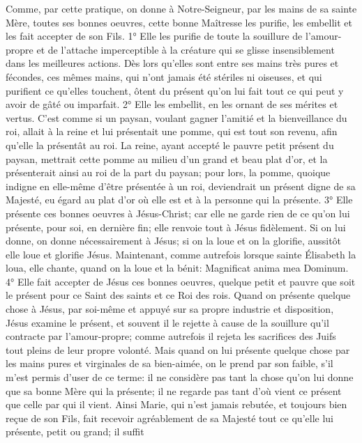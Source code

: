  Comme, par cette pratique, on donne à Notre-Seigneur, par les mains de sa sainte Mère, toutes ses bonnes
oeuvres, cette bonne Maîtresse les purifie, les embellit et les fait accepter de son Fils.
1° Elle les purifie de toute la souillure de l'amour-propre et de l'attache imperceptible à la créature qui se glisse
insensiblement dans les meilleures actions. Dès lors qu'elles sont entre ses mains très pures et fécondes, ces
mêmes mains, qui n'ont jamais été stériles ni oiseuses, et qui purifient ce qu'elles touchent, ôtent du présent qu'on
lui fait tout ce qui peut y avoir de gâté ou imparfait.
 2° Elle les embellit, en les ornant de ses mérites et vertus. C'est comme si un paysan, voulant gagner l'amitié
et la bienveillance du roi, allait à la reine et lui présentait une pomme, qui est tout son revenu, afin qu'elle la
présentât au roi. La reine, ayant accepté le pauvre petit présent du paysan, mettrait cette pomme au milieu d'un
grand et beau plat d'or, et la présenterait ainsi au roi de la part du paysan; pour lors, la pomme, quoique indigne en
elle-même d'être présentée à un roi, deviendrait un présent digne de sa Majesté, eu égard au plat d'or où elle est
et à la personne qui la présente.
 3° Elle présente ces bonnes oeuvres à Jésus-Christ; car elle ne garde rien de ce qu'on lui présente, pour soi,
en dernière fin; elle renvoie tout à Jésus fidèlement. Si on lui donne, on donne nécessairement à Jésus; si on la
loue et on la glorifie, aussitôt elle loue et glorifie Jésus. Maintenant, comme autrefois lorsque sainte Élisabeth la
loua, elle chante, quand on la loue et la bénit: Magnificat anima mea Dominum.
 4° Elle fait accepter de Jésus ces bonnes oeuvres, quelque petit et pauvre que soit le présent pour ce Saint
des saints et ce Roi des rois. Quand on présente quelque chose à Jésus, par soi-même et appuyé sur sa propre
industrie et disposition, Jésus examine le présent, et souvent il le rejette à cause de la souillure qu'il contracte par
l'amour-propre; comme autrefois il rejeta les sacrifices des Juifs tout pleins de leur propre volonté. Mais quand on
lui présente quelque chose par les mains pures et virginales de sa bien-aimée, on le prend par son faible, s'il m'est
permis d'user de ce terme: il ne considère pas tant la chose qu'on lui donne que sa bonne Mère qui la présente; il
ne regarde pas tant d'où vient ce présent que celle par qui il vient. Ainsi Marie, qui n'est jamais rebutée, et toujours
bien reçue de son Fils, fait recevoir agréablement de sa Majesté tout ce qu'elle lui présente, petit ou grand; il suffit
